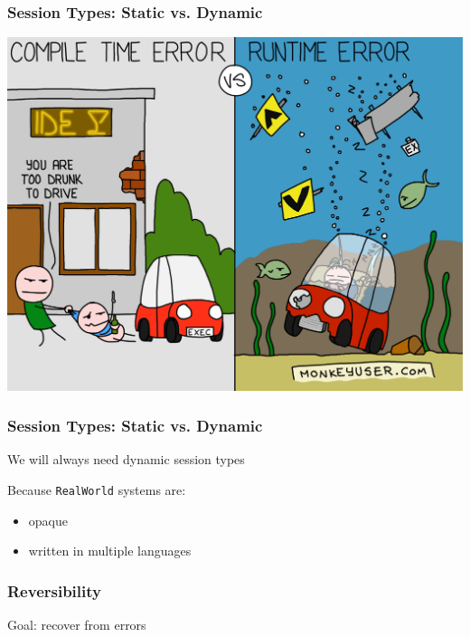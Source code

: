 \documentclass[12pt]{beamer}
\begin{document}
\begin{frame}
\frametitle{Session Types: Static vs. Dynamic}

\begin{center}
\includegraphics[scale=0.120]{img/runtime-vs-compile-time-errors.png}
\end{center}
\end{frame}

\begin{frame}
\frametitle{Session Types: Static vs. Dynamic}
\begin{center}

    \Large{We will always need dynamic session types}

\end{center}
Because \texttt{RealWorld} systems are: 


\begin{itemize}
    \item opaque
    \item written in multiple languages
\end{itemize}

\end{frame}


\begin{frame}
\frametitle{Reversibility}

\begin{center}
    \Large{Goal: recover from errors}


    
\end{center}

\end{frame}
\end{document}
